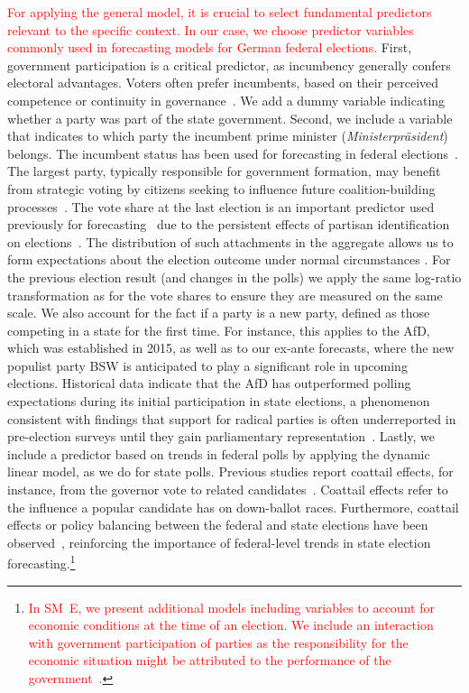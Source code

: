 \documentclass[12pt]{article}
\begin{document}
\begin{doublespacing}
\textcolor{red}{For applying the general model, it is crucial to select fundamental predictors relevant to the specific context. In our case, we choose predictor variables commonly used in forecasting models for German federal elections.}  First, government participation is a critical predictor, as incumbency generally confers electoral advantages. Voters often prefer incumbents, based on their perceived competence or continuity in governance~\citep{allers2022parties,eggers_incumbency_2017}.
We add a dummy variable indicating whether a party was part of the state government.  Second, we include a variable that indicates to which party the incumbent prime minister (\textit{Ministerpräsident}) belongs. The incumbent status has been used for forecasting in federal elections~\citep{munzert_2017}. The largest party, typically responsible for government formation, may benefit from strategic voting by citizens seeking to influence future coalition-building processes~\citep{cox1997making,Harsgor2023, Meffert2010}.
The vote share at the last election is an important predictor used previously for forecasting~\citep{munzert_2017, Stoetzer_Neunhoeffer_Gschwend_Munzert_Sternberg_2019} due to the persistent effects of partisan identification on elections~\citep{campbell_impact_1960}. The distribution of such attachments in the aggregate allows us to form expectations about the election outcome under normal circumstances \citep{Converse1966}. For the previous election result (and changes in the polls) we apply the same log-ratio transformation as for the vote shares to ensure they are measured on the same scale.
We also account for the fact if a party is a new party, defined as those competing in a state for the first time. For instance, this applies to the AfD, which was established in 2015, as well as to our ex-ante forecasts, where the new populist party BSW is anticipated to play a significant role in upcoming elections. Historical data indicate that the AfD has outperformed polling expectations during its initial participation in state elections, a phenomenon consistent with findings that support for radical parties is often underreported in pre-election surveys until they gain parliamentary representation~\citep{valentim_right_2021}.
Lastly, we include a predictor based on trends in federal polls by applying the dynamic linear model, as we do for state polls. Previous studies report coattail effects, for instance, from the governor vote to related candidates~\citep{MEREDITH_2013}. Coattail effects refer to the influence a popular candidate has on down-ballot races. Furthermore, coattail effects or policy balancing between the federal and state elections have been observed~\citep{BORGES2016104, Kedar2006a}, reinforcing the importance of federal-level trends in state election forecasting.\footnote{\textcolor{red}{In SM~E, we present additional models including variables to account for economic conditions at the time of an election. We include an interaction with government participation of parties as the responsibility for the economic situation might be attributed to the performance of the government~\citep{enns2024understanding, mongrain202110}.}}


\end{doublespacing}
\end{document}
